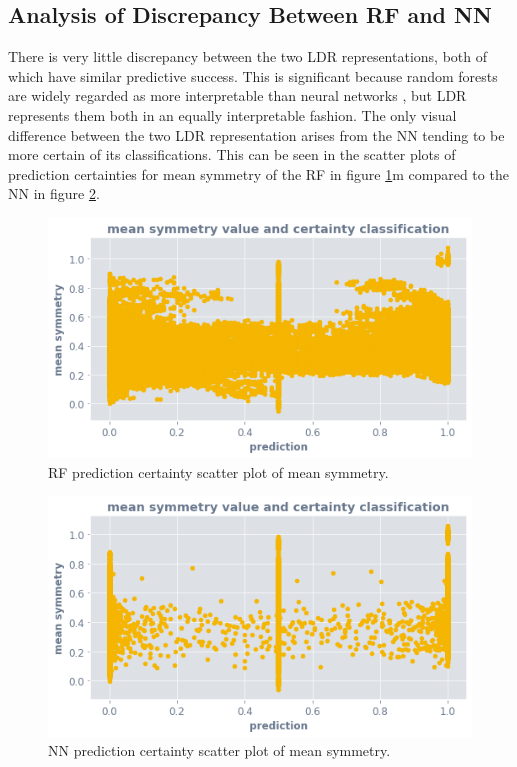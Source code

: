 \documentclass[a4paper, twocolumn]{article}
\begin{document}
\subsection{Analysis of Discrepancy Between RF and NN}

There is very little discrepancy between the two LDR representations, both of which have similar predictive success. This is significant because random forests are widely regarded as more interpretable than neural networks \cite{song2013random}, but LDR represents them both in an equally interpretable fashion. The only visual difference between the two LDR representation arises from the NN tending to be more certain of its classifications. This can be seen in the scatter plots of prediction certainties for mean symmetry of the RF in figure \ref{fig:rf-ocsvm-mean-symmetry-scatter}m compared to the NN in figure \ref{fig:nn-ocsvm-mean-symmetry-scatter}.

\begin{figure}
\centering
\includegraphics[width=0.7\columnwidth]{img/rf_ocsvm_mean_symmetry.png}
\caption{RF prediction certainty scatter plot of mean symmetry.}
\label{fig:rf-ocsvm-mean-symmetry-scatter}
\end{figure}

\begin{figure}
\centering
\includegraphics[width=0.7\columnwidth]{img/nn_ocsvm_mean_symmetry.png}
\caption{NN prediction certainty scatter plot of mean symmetry.}
\label{fig:nn-ocsvm-mean-symmetry-scatter}
\end{figure}
\end{document}
